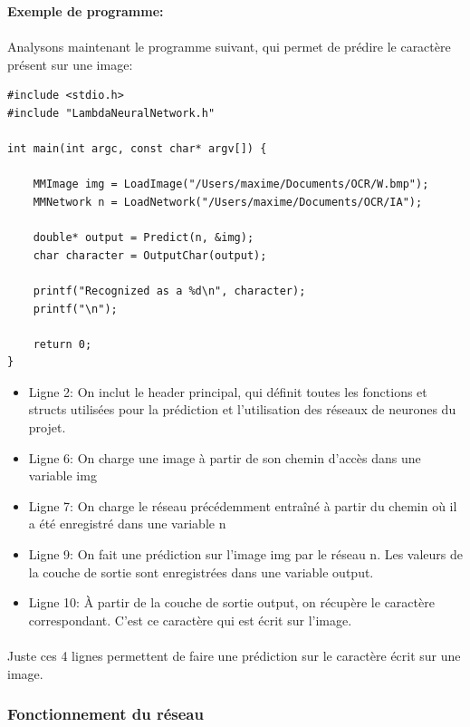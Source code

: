 \documentclass{article}
\begin{document}
\textbf{Exemple de programme:}

\paragraph{}Analysons maintenant le programme suivant, qui permet de prédire le caractère présent sur une image:


\begin{lstlisting}
#include <stdio.h>
#include "LambdaNeuralNetwork.h"

int main(int argc, const char* argv[]) {

	MMImage img = LoadImage("/Users/maxime/Documents/OCR/W.bmp");
	MMNetwork n = LoadNetwork("/Users/maxime/Documents/OCR/IA");
	
	double* output = Predict(n, &img);
	char character = OutputChar(output);
	
	printf("Recognized as a %d\n", character);
	printf("\n");
	
	return 0;
}
\end{lstlisting}


\begin{itemize}
	\item Ligne 2: On inclut le header principal, qui définit toutes les fonctions et structs utilisées pour la prédiction et l'utilisation des réseaux de neurones du projet.
	\item Ligne 6: On charge une image à partir de son chemin d'accès dans une variable img
	\item Ligne 7: On charge le réseau précédemment entraîné à partir du chemin où il a été enregistré dans une variable n
	\item Ligne 9: On fait une prédiction sur l'image img par le réseau n. Les valeurs de la couche de sortie sont enregistrées dans une variable output.
	\item Ligne 10: À partir de la couche de sortie output, on récupère le caractère correspondant. C'est ce caractère qui est écrit sur l'image.
\end{itemize}

\paragraph{}Juste ces 4 lignes permettent de faire une prédiction sur le caractère écrit sur une image.

\newpage

\subsubsection{Fonctionnement du réseau}
\end{document}
